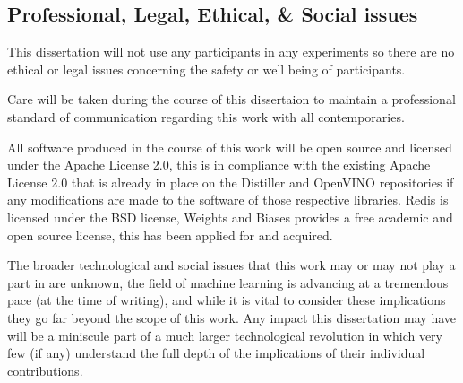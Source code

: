 \documentclass[../D1.tex]{subfiles}
\begin{document}
\subsection{Professional, Legal, Ethical, \& Social issues}
This dissertation will not use any participants in any experiments so there are no ethical or legal issues concerning the safety or well being of participants.


Care will be taken during the course of this dissertaion to maintain a professional standard of communication regarding this work with all contemporaries. 


All software produced in the course of this work will be open source and licensed under the Apache License 2.0, this is in  compliance with the existing Apache License 2.0 that is already in place on the Distiller and OpenVINO repositories if any modifications are made to the software of those respective libraries.
Redis is licensed under the BSD license, Weights and Biases provides a free academic and open source license, this has been applied for and acquired.


The broader technological and social issues that this work may or may not play a part in are unknown, the field of machine learning is advancing at a tremendous pace (at the time of writing), and while it is vital to consider these implications they go far beyond the scope of this work. 
Any impact this dissertation may have will be a miniscule part of a much larger technological revolution in which very few (if any) understand the full depth of the implications of their individual contributions.
\end{document}
